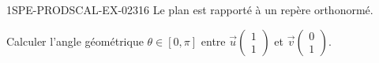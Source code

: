 \begin{exercice}{1SPE-PRODSCAL-EX-023}{1}{6}
Le plan est rapporté à un repère orthonormé.

Calculer l'angle géométrique $\theta\in[0,\pi]$ entre $\vec{u}\begin{pmatrix} 1 \\ 1 \end{pmatrix}$ et $\vec{v}\begin{pmatrix} 0 \\ 1 \end{pmatrix}$.
\end{exercice}
